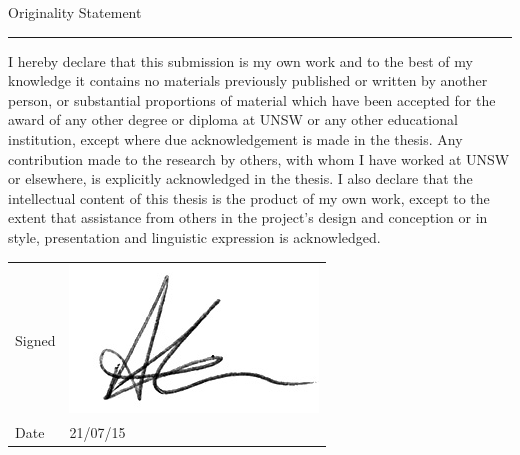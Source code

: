 
\begin{declaration2}

\begin{center}
\Large Originality Statement \\
\vspace{0.7cm}
\hrule



\end{center}
\vspace{1cm}

\normalsize


I hereby declare that this submission is my own work and to the best of my
knowledge it contains no materials previously published or written by another
person, or substantial proportions of material which have been accepted for the
award of any other degree or diploma at UNSW or any other educational
institution, except where due acknowledgement is made in the thesis. Any
contribution made to the research by others, with whom I have worked at UNSW or
elsewhere, is explicitly acknowledged in the thesis. I also declare that the
intellectual content of this thesis is the product of my own work, except to
the extent that assistance from others in the project's design and conception
or in style, presentation and linguistic expression is acknowledged.


\end{declaration2}

\vspace{1cm}

\begin{tabular}[h!]{lp{6cm}}
  Signed & \includegraphics[height=1.5\baselineskip]{Declaration/sig-crop} \\
  Date & 21/07/15
\end{tabular}

